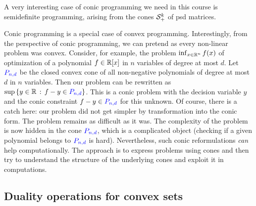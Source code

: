 A very interesting case of conic programming we need in this course is semidefinite programming, arising from the cones $\mathcal{S}_+^k$ of psd matrices. 

Conic programming is a special case of convex programming. Interestingly, from the perspective of conic programming, we can pretend as every non-linear problem was convex. Consider, for example, the problem $\inf_{x \in \mathbb{R}^n} f(x)$ of  optimization of a polynomial $f \in \mathbb{R}[x]$ in $n$ variables of degree at most $d$. Let $\textcolor{blue}{P_{n,d}}$ be the closed convex cone of all non-negative polynomials of degree at most $d$ in $n$ variables. Then our problem can be rewritten as $\sup \left\{ y \in \mathbb{R} \,:\, f - y \in \textcolor{blue}{P_{n,d}} \right\}$. This is a conic problem with the decision variable $y$ and the conic constraint $f - y \in \textcolor{blue}{P_{n,d}}$ for this unknown. Of course, there is a catch here: our problem did not get simpler by transformation into the conic form. The problem remains as difficult as it was. The complexity of the problem is now hidden in the cone $\textcolor{blue}{P_{n,d}}$, which is a complicated object (checking if a given polynomial belongs to $\textcolor{blue}{P_{n,d}}$ is hard). Nevertheless, such conic reformulations \emph{can} help computationally. The approach is to express problems using cones and then try to understand the structure of the underlying cones and exploit it in computations. 


\subsection{Duality operations for convex sets}

